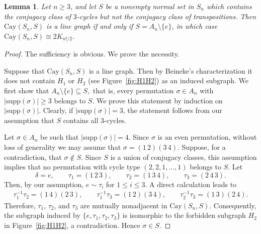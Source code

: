 \documentclass[12pt, a4paper]{article}
\newtheorem{lem}[thm]{Lemma}
\theoremstyle{definition}
\begin{document}
\begin{lem}\label{3-cycle-linegraph}
Let $n\ge 3$, and let $S$ be a nonempty normal set in $S_n$ which contains the conjugacy class of $3$-cycles but not the conjugacy class of transpositions. Then $\mathrm{Cay}(S_n,S)$ is a line graph 
if and only if $S=A_n\setminus\{e\}$, in which case $\mathrm{Cay}(S_n,S) \cong 2 K_{n!/2}$.
\end{lem}
\begin{proof}
The sufficiency is obvious. We prove the necessity.

Suppose that $\mathrm{Cay}(S_n, S)$ is a line graph. Then by Beineke's characterization it does not contain $H_1$ or $H_2$ (see Figure~\ref{fig:H1H2}) as an induced subgraph. We first show that
\(
A_n\setminus\{e\}\subseteq S,
\)
that is, every permutation $\sigma\in A_n$ with $|\mathrm{supp}(\sigma)|\ge 3$ belongs to $S$. We prove this statement by induction on $|\mathrm{supp}(\sigma)|$. Clearly, if $|\mathrm{supp}(\sigma)|=3$, the statement follows from our assumption that $S$ contains all 3-cycles. 

Let $\sigma \in A_n$ be such that $|\mathrm{supp}(\sigma)|=4$. Since $\sigma$ is an even permutation, without loss of generality we may assume that
\(
\sigma=(1\,2)(3\,4).
\)
Suppose, for a contradiction, that $\sigma \notin S$. Since $S$ is a union of conjugacy classes, this assumption implies that no permutation with cycle type $(2,2, 1, \ldots, 1)$ belongs to $S$. 
Let
\[
\delta=e,\qquad
\tau_1=(1\,2\,3),\qquad
\tau_2=(1\,3\,4),\qquad
\tau_3=(2\,4\,3).
\]
Then, by our assumption, $e \sim \tau_i$ for $1\le i\le 3$. A direct calculation leads to
\begin{align*}
\tau_1^{-1}\tau_2 =  (1\,4)(2\,3), \qquad
\tau_1^{-1}\tau_3 =  (1\,2)(3\,4), \qquad
\tau_2^{-1}\tau_3 =  (1\,3)(2\,4).
\end{align*}
Therefore, $\tau_1$, $\tau_2$, and $\tau_3$ are mutually nonadjacent in $\mathrm{Cay}(S_n,S)$.
Consequently, the subgraph induced by $\{e, \tau_1, \tau_2, \tau_3\}$ is isomorphic to the forbidden subgraph $H_2$ in Figure~\ref{fig:H1H2}, a contradiction. Hence $\sigma \in S$.


\end{proof}
\end{document}
